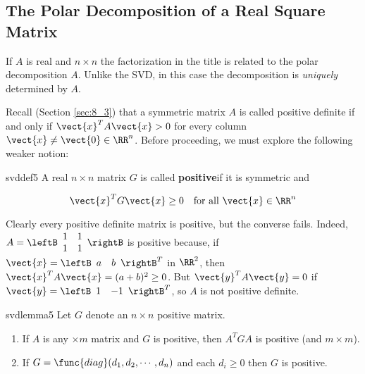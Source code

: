 \subsection{The Polar Decomposition of a Real Square Matrix}


\noindent If $A$ is real and $n\times n$ the factorization in the title is
related to the polar decomposition $A$. Unlike the SVD, in this case the
decomposition is \emph{uniquely} determined by $A$. 

Recall (Section \ref{sec:8_3}) that a symmetric matrix $A$ is called positive definite if and only if
$\vect{x}^{T}A\vect{x}>0$ for every column $\vect{x} \neq \vect{0} \in \RR^{n}$. Before
proceeding, we must explore the following weaker notion:

\begin{definition}{}{svddef5} 
A real $n\times n$ matrix $G$ is called \textbf{positive}\footnotemark if it is symmetric and 

\begin{equation*}
\vect{x}^{T}G\vect{x}\geq 0 \quad \mbox{for all } \vect{x}\in \RR^{n}
\end{equation*}
\end{definition}

\noindent Clearly every positive definite matrix is positive, but the
converse fails. Indeed, $A=
\leftB 
\begin{array}{cc}
1 & 1 \\ 
1 & 1
\end{array}
\rightB $ is positive because, if $\vect{x}=\leftB \begin{array}{cc} a & b \end{array}\rightB^{T}$ in $\RR^{2}$, then $\vect{x}^{T}A\vect{x}=(a+b)^{2}\geq 0$. But $\vect{y}^{T}A\vect{y}=0$ if $\vect{y}=\leftB \begin{array}{cc} 1 & -1 \end{array}\rightB^{T}$, so $A$ is not positive
definite.

\begin{lemma}{}{svdlemma5}
Let $G$ denote an $n\times n$ positive matrix.

\begin{enumerate}
\item If $A$ is any $\times m$ matrix and $G$ is positive, then $A^{T}GA$ is positive (and $m\times m$).

\item If $G=\func{diag}(d_{1}, d_{2},\cdots ,d_{n})$ and each $d_{i}\geq 0$ then $G$ is positive.
\end{enumerate}
\end{lemma}

